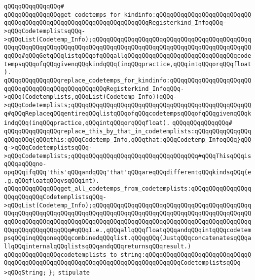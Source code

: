 \verb|qQQqqQQqqQQqqQQq#|\newline
\verb|qQQqqQQqqQQqqQQqget_codetemps_for_kindinfo:qQQqqQQqqQQqqQQqqQQqqQQqqQQqqQQqqQQqqQQqqQQqqQQqqQQqqQQqqQQqqQQqqQQqRegisterkind_InfoqQQq->qQQqCodetemplistsqQQq->qQQqList(Codetemp_Info);qQQqqQQqqQQqqQQqqQQqqQQqqQQqqQQqqQQqqQQqqQQqqQQqqQQqqQQqqQQqqQQqqQQqqQQqqQQqqQQqqQQqqQQqqQQqqQQqqQQqqQQqqQQqqQQqqQQqqQQq#qQQqGetqQQqlistqQQqofqQQqallqQQqqQQqqQQqqQQqqQQqqQQqqQQqqQQqcodetempsqQQqofqQQqgivenqQQqkindqQQq(inqQQqpractice,qQQqintqQQqorqQQqfloat).|\newline
\verb|qQQqqQQqqQQqqQQqreplace_codetemps_for_kindinfo:qQQqqQQqqQQqqQQqqQQqqQQqqQQqqQQqqQQqqQQqqQQqqQQqqQQqRegisterkind_InfoqQQq->qQQq(Codetemplists,qQQqList(Codetemp_Info))qQQq->qQQqCodetemplists;qQQqqQQqqQQqqQQqqQQqqQQqqQQqqQQqqQQqqQQqqQQqqQQqqQQq#qQQqReplaceqQQqentireqQQqlistqQQqofqQQqcodetempsqQQqofqQQqgivenqQQqkindqQQq(inqQQqpractice,qQQqintqQQqorqQQqfloat).|\newline
\verb|qQQqqQQqqQQqqQQq#|\newline
\verb|qQQqqQQqqQQqqQQqreplace_this_by_that_in_codetemplists:qQQqqQQqqQQqqQQqqQQqqQQq{qQQqthis:qQQqCodetemp_Info,qQQqthat:qQQqCodetemp_InfoqQQq}qQQq->qQQqCodetemplistsqQQq->qQQqCodetemplists;qQQqqQQqqQQqqQQqqQQqqQQqqQQqqQQqqQQq#qQQqThisqQQqisqQQqaqQQqno-opqQQqifqQQq'this'qQQqandqQQq'that'qQQqareqQQqdifferentqQQqkindsqQQq(e.g.qQQqfloatqQQqvsqQQqint).|\newline
\newline
\verb|qQQqqQQqqQQqqQQqget_all_codetemps_from_codetemplists:qQQqqQQqqQQqqQQqqQQqqQQqqQQqCodetemplistsqQQq->qQQqList(Codetemp_Info);qQQqqQQqqQQqqQQqqQQqqQQqqQQqqQQqqQQqqQQqqQQqqQQqqQQqqQQqqQQqqQQqqQQqqQQqqQQqqQQqqQQqqQQqqQQqqQQqqQQqqQQqqQQqqQQqqQQqqQQqqQQqqQQqqQQqqQQqqQQqqQQqqQQqqQQqqQQqqQQqqQQqqQQqqQQqqQQqqQQqqQQqqQQqqQQqqQQqqQQqqQQq#qQQqI.e.,qQQqallqQQqfloatqQQqandqQQqintqQQqcodetempsqQQqinqQQqoneqQQqcombinedqQQqlist.qQQqqQQq(JustqQQqconcatenatesqQQqallqQQqinternalqQQqlistsqQQqandqQQqreturnsqQQqresult.)|\newline
\newline
\verb|qQQqqQQqqQQqqQQqcodetemplists_to_string:qQQqqQQqqQQqqQQqqQQqqQQqqQQqqQQqqQQqqQQqqQQqqQQqqQQqqQQqqQQqqQQqqQQqqQQqqQQqqQQqCodetemplistsqQQq->qQQqString;|\newline
\verb|};|\newline
\newline
\newline
\newline
\newline
\verb|stipulate|\newline
